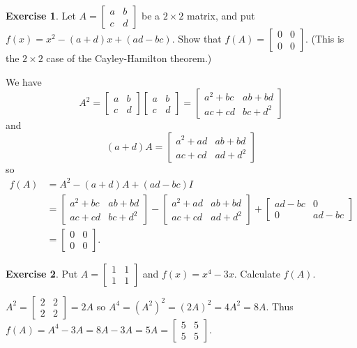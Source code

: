 \documentclass{amsart}
\newcommand{\bbm}       {\left[\begin{matrix}}
\newcommand{\bsm}       {\left[\begin{smallmatrix}}
\newcommand{\ebm}       {\end{matrix}\right]}
\newcommand{\esm}       {\end{smallmatrix}\right]}
\newcommand{\tm}        {\times}
\newcommand{\ip}[1]     {\langle #1\rangle}
\renewcommand{\:}{\colon}
\theoremstyle{definition}
\newtheorem{exercise}{Exercise}[section]
\renewenvironment{solution}{\SolutionAtEnd}{\endSolutionAtEnd}
\begin{document}
\begin{exercise}
 Let $A=\bsm a&b\\ c&d\esm$ be a $2\tm 2$ matrix, and put
 $f(x)=x^2-(a+d)x+(ad-bc)$.  Show that $f(A)=\bsm 0&0\\0&0\esm$.
 (This is the $2\tm 2$ case of the Cayley-Hamilton theorem.)
\end{exercise}
\begin{solution}
 We have
 \[ A^2 = \bbm a&b\\c&d\ebm\bbm a&b\\c&d\ebm
        = \bbm a^2 + bc & ab + bd \\ ac + cd & bc+d^2 \ebm
 \]
 and
 \[ (a+d)A = \bbm a^2+ad & ab+bd \\ ac + cd & ad + d^2 \ebm \]
 so
 \begin{align*}
  f(A) &= A^2 - (a+d)A + (ad-bc)I \\
       &= \bbm a^2 + bc & ab + bd \\ ac + cd & bc+d^2 \ebm
          - \bbm a^2+ad & ab+bd \\ ac + cd & ad + d^2 \ebm +
          \bbm ad-bc & 0 \\ 0 & ad-bc \ebm \\
       &= \bbm 0 & 0\\0 & 0\ebm.
 \end{align*}
\end{solution}


\begin{exercise}
 Put $A=\bsm 1&1\\1&1\esm$ and $f(x)=x^4-3x$.  Calculate $f(A)$.
\end{exercise}
\begin{solution}
 $A^2=\bsm 2&2\\2&2\esm=2A$ so $A^4=(A^2)^2=(2A)^2=4A^2=8A$.  Thus
 $f(A)=A^4-3A=8A-3A=5A=\bsm 5&5\\5&5\esm$. 
\end{solution}
\end{document}
